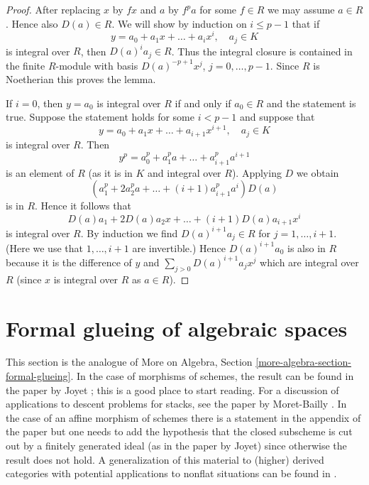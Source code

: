 \begin{proof}
After replacing $x$ by $fx$ and $a$ by $f^pa$ for some $f \in R$
we may assume $a \in R$. Hence also $D(a) \in R$. We will show
by induction on $i \leq p - 1$ that if
$$
y = a_0 + a_1x + \ldots + a_i x^i,\quad a_j \in K
$$
is integral over $R$, then $D(a)^i a_j \in R$. Thus the integral
closure is contained in the finite $R$-module with basis
$D(a)^{-p + 1}x^j$, $j = 0, \ldots, p - 1$. Since $R$ is Noetherian
this proves the lemma.

\medskip\noindent
If $i = 0$, then $y = a_0$ is integral over $R$ if and only if $a_0 \in R$
and the statement is true. Suppose the statement holds for some $i < p - 1$
and suppose that
$$
y = a_0 + a_1x + \ldots + a_{i + 1} x^{i + 1},\quad a_j \in K
$$
is integral over $R$. Then
$$
y^p = a_0^p + a_1^p a + \ldots + a_{i + 1}^pa^{i + 1}
$$
is an element of $R$ (as it is in $K$ and integral over $R$). Applying
$D$ we obtain
$$
(a_1^p + 2a_2^p a + \ldots + (i + 1)a_{i + 1}^p a^i)D(a)
$$
is in $R$. Hence it follows that
$$
D(a)a_1 + 2D(a) a_2 x + \ldots + (i + 1)D(a) a_{i + 1} x^i
$$
is integral over $R$. By induction we find $D(a)^{i + 1}a_j \in R$
for $j = 1, \ldots, i + 1$. (Here we use that $1, \ldots, i + 1$
are invertible.) Hence $D(a)^{i + 1}a_0$ is also in $R$ because it
is the difference of $y$ and $\sum_{j > 0} D(a)^{i + 1}a_jx^j$ which
are integral over $R$ (since $x$ is integral over $R$ as $a \in R$).
\end{proof}






\section{Formal glueing of algebraic spaces}
\label{section-formal-glueing}

\noindent
This section is the analogue of
More on Algebra, Section \ref{more-algebra-section-formal-glueing}.
In the case of morphisms of schemes, the result can be found in
the paper by Joyet \cite{Joyet}; this is a good place to start reading.
For a discussion of applications to descent problems for stacks, see the
paper by Moret-Bailly \cite{MB}. In the case of an affine
morphism of schemes there is a statement in the appendix of the paper
\cite{Ferrand-Raynaud} but one needs to add the hypothesis
that the closed subscheme is cut out by a finitely generated
ideal (as in the paper by Joyet) since otherwise the result does not hold.
A generalization of this material to (higher) derived categories
with potential applications to nonflat situations
can be found in \cite[Section 5]{Bhatt-Algebraize}.

